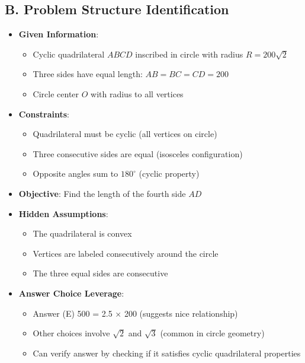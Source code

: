 \documentclass[12pt]{article}
\begin{document}
\begin{problemconfigbox}
\subsection*{B. Problem Structure Identification}
\begin{itemize}[leftmargin=*]
    \item \textbf{Given Information}: 
    \begin{itemize}
        \item Cyclic quadrilateral $ABCD$ inscribed in circle with radius $R = 200\sqrt{2}$
        \item Three sides have equal length: $AB = BC = CD = 200$
        \item Circle center $O$ with radius to all vertices
    \end{itemize}
    \item \textbf{Constraints}: 
    \begin{itemize}
        \item Quadrilateral must be cyclic (all vertices on circle)
        \item Three consecutive sides are equal (isosceles configuration)
        \item Opposite angles sum to $180^\circ$ (cyclic property)
    \end{itemize}
    \item \textbf{Objective}: Find the length of the fourth side $AD$
    \item \textbf{Hidden Assumptions}: 
    \begin{itemize}
        \item The quadrilateral is convex
        \item Vertices are labeled consecutively around the circle
        \item The three equal sides are consecutive
    \end{itemize}
    \item \textbf{Answer Choice Leverage}: 
    \begin{itemize}
        \item Answer (E) 500 = 2.5 × 200 (suggests nice relationship)
        \item Other choices involve $\sqrt{2}$ and $\sqrt{3}$ (common in circle geometry)
        \item Can verify answer by checking if it satisfies cyclic quadrilateral properties
    \end{itemize}
\end{itemize}


\end{problemconfigbox}
\end{document}
